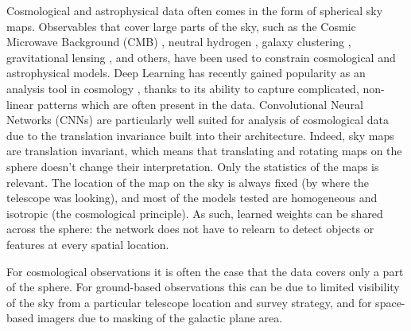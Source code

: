 \documentclass[final,twocolumn,3p,times,authoryear]{elsarticle}
\newcommand{\nati}[1]{{\color[rgb]{.1,.6,.1}{#1}}}
\newcommand{\todo}[1]{{\color[rgb]{.6,.1,.6}{#1}}}
\newcommand{\1}{\b{1}}              %
\newcommand{\0}{\b{0}}              %
\begin{document}
Cosmological and astrophysical data often comes in the form of spherical sky maps.
Observables that cover large parts of the sky, such as the Cosmic Microwave Background (CMB) \citep{planck2015cosmologicalparameters,komatsu2011sevenyear,staggs2018recentdiscoveries}, neutral hydrogen \citep{santos2015cosmologySKA,HI4PI2016fullskyHI}, galaxy clustering \citep{alam2017clusteringgalaxies}, gravitational lensing \citep{troxel2017darkenergy,hildebrandt2017kidscosmological}, and others, have been used to constrain cosmological and astrophysical models. Deep Learning has recently gained popularity as an analysis tool in cosmology \citep{schmelze2017cosmologicalmodel,luciesmith2018machinelearning,gupta2018nongaussianinformation,gillet2018deeplearning,hassan2018reionizationmodels,aragoncalvo2018classyfyinglarge,ciuca2017cnnstring}, thanks to its ability to capture complicated, non-linear patterns which are often present in the data. Convolutional Neural Networks (CNNs) are particularly well suited for analysis of cosmological data due to the translation invariance built into their architecture. Indeed, sky maps are translation invariant, which means that translating and rotating maps on the sphere doesn't change their interpretation. Only the statistics of the maps is relevant. The location of the map on the sky is always fixed (by where the telescope was looking), and most of the models tested are homogeneous and isotropic (the cosmological principle). As such, learned weights can be shared across the sphere: the network does not have to relearn to detect objects or features at every spatial location.

For cosmological observations it is often the case that the data covers only a part of the sphere.
For ground-based observations this can be due to limited visibility of the sky from a particular telescope location and survey strategy, and for space-based imagers due to masking of the galactic plane area.


\end{document}
